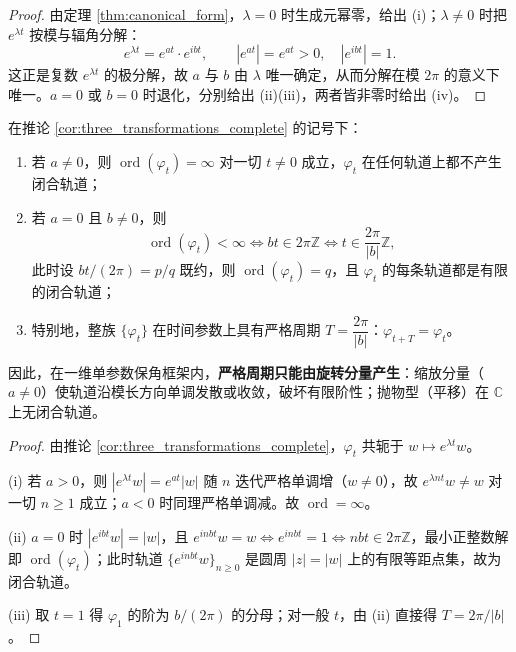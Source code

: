 \begin{proof}
由定理 \ref{thm:canonical_form}，$\lambda=0$ 时生成元幂零，给出 (i)；$\lambda\neq0$ 时把 $e^{\lambda t}$ 按模与辐角分解：
\[
e^{\lambda t}=e^{at}\cdot e^{ibt},\qquad |e^{at}|=e^{at}>0,\quad |e^{ibt}|=1 .
\]
这正是复数 $e^{\lambda t}$ 的极分解，故 $a$ 与 $b$ 由 $\lambda$ 唯一确定，从而分解在模 $2\pi$ 的意义下唯一。$a=0$ 或 $b=0$ 时退化，分别给出 (ii)(iii)，两者皆非零时给出 (iv)。
\end{proof}

\begin{corollary}[周期的唯一来源是旋转分量]\label{cor:period_only_from_rotation}
在推论 \ref{cor:three_transformations_complete} 的记号下：
\begin{enumerate}[label=(\roman*)]
    \item 若 $a\neq0$，则 $\operatorname{ord}(\varphi_t)=\infty$ 对一切 $t\neq0$ 成立，$\varphi_t$ 在任何轨道上都不产生闭合轨道；
    \item 若 $a=0$ 且 $b\neq0$，则
    \[
    \operatorname{ord}(\varphi_t)<\infty\iff bt\in2\pi\mathbb Z\iff t\in\frac{2\pi}{|b|}\mathbb Z ,
    \]
    此时设 $bt/(2\pi)=p/q$ 既约，则 $\operatorname{ord}(\varphi_t)=q$，且 $\varphi_t$ 的每条轨道都是有限的闭合轨道；
    \item 特别地，整族 $\{\varphi_t\}$ 在时间参数上具有严格周期 $T=\dfrac{2\pi}{|b|}$：$\varphi_{t+T}=\varphi_t$。
\end{enumerate}
因此，在一维单参数保角框架内，\textbf{严格周期只能由旋转分量产生}：缩放分量（$a\neq0$）使轨道沿模长方向单调发散或收敛，破坏有限阶性；抛物型（平移）在 $\mathbb C$ 上无闭合轨道。
\end{corollary}

\begin{proof}
由推论 \ref{cor:three_transformations_complete}，$\varphi_t$ 共轭于 $w\mapsto e^{\lambda t}w$。

(i) 若 $a>0$，则 $|e^{\lambda t}w|=e^{at}|w|$ 随 $n$ 迭代严格单调增（$w\neq0$），故 $e^{\lambda nt}w\neq w$ 对一切 $n\ge1$ 成立；$a<0$ 时同理严格单调减。故 $\operatorname{ord}=\infty$。

(ii) $a=0$ 时 $|e^{ibt}w|=|w|$，且 $e^{inbt}w=w\iff e^{inbt}=1\iff nbt\in2\pi\mathbb Z$，最小正整数解即 $\operatorname{ord}(\varphi_t)$；此时轨道 $\{e^{inbt}w\}_{n\ge0}$ 是圆周 $|z|=|w|$ 上的有限等距点集，故为闭合轨道。

(iii) 取 $t=1$ 得 $\varphi_1$ 的阶为 $b/(2\pi)$ 的分母；对一般 $t$，由 (ii) 直接得 $T=2\pi/|b|$。
\end{proof}

